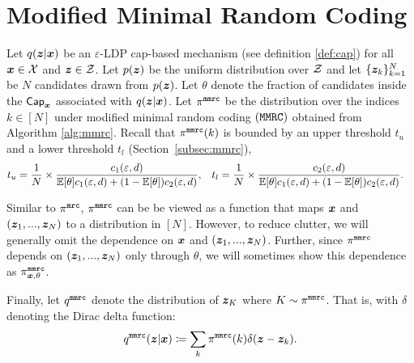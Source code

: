 \section{Modified Minimal Random Coding}
\label{appendix:mmrc}

Let $q({\boldsymbol{z}}|{\boldsymbol{x}})$ be an $\varepsilon$-LDP cap-based mechanism (see definition \ref{def:cap}) for all ${\boldsymbol{x}} \in \mathcal{X}$ and ${\boldsymbol{z}} \in \mathcal{Z}$. Let $p({\boldsymbol{z}})$ be the uniform distribution over $\mathcal{Z}$ and let $\{{\boldsymbol{z}}_k\}_{k=1}^{N}$ be $N$ candidates drawn from $p({\boldsymbol{z}})$. Let $\theta$ denote the fraction of candidates inside the $\mathsf{Cap}_{{\boldsymbol{x}}}$ associated with $q({\boldsymbol{z}}|{\boldsymbol{x}})$. Let $\pi^{\texttt{mmrc}}$ be the distribution over the indices $k \in [N]$ under modified minimal random coding $(\texttt{MMRC})$ obtained from Algorithm \ref{alg:mmrc}.
Recall that $\pi^{\texttt{mmrc}}(k)$ is bounded by an upper threshold $t_u$ and a lower threshold $t_l$ (Section~\ref{subsec:mmrc}),
\begin{align}
    t_u &= \frac{1}{N} \times \frac{c_1(\varepsilon, d)}{\mathbb{E}[\theta] c_1(\varepsilon, d) + (1 - \mathbb{E}[\theta]) c_2(\varepsilon, d)}, & 
    t_l &= \frac{1}{N} \times \frac{c_2(\varepsilon, d)}{\mathbb{E}[\theta] c_1(\varepsilon, d) + (1 - \mathbb{E}[\theta]) c_2(\varepsilon, d)}.
\end{align}

Similar to $\pi^{\texttt{mrc}}$, $\pi^{\texttt{mmrc}}$ can be be viewed as a function that maps ${\boldsymbol{x}}$ and $({\boldsymbol{z}}_1,...,{\boldsymbol{z}}_N)$ to a distribution in $[N]$. However, to reduce clutter, we will generally omit the dependence on ${\boldsymbol{x}}$ and $({\boldsymbol{z}}_1,...,{\boldsymbol{z}}_N)$. Further, since  $\pi^{\texttt{mmrc}}$ depends on $({\boldsymbol{z}}_1,...,{\boldsymbol{z}}_N)$ only through $\theta$, we will sometimes show this dependence as $\pi^{\texttt{mmrc}}_{{\boldsymbol{x}}, \theta}$. 

Finally, let $q^{\texttt{mmrc}}$ denote the distribution of ${\boldsymbol{z}}_K$ where $K \sim \pi^{\texttt{mmrc}}$.
That is, with $\delta$ denoting the Dirac delta function:
\begin{align}
    q^{\texttt{mmrc}}({\boldsymbol{z}} | {\boldsymbol{x}}) \coloneqq \sum_{k} \pi^{\texttt{mmrc}}(k) \delta({\boldsymbol{z}} - {\boldsymbol{z}}_k). \label{eq:qmmrc}
\end{align}


